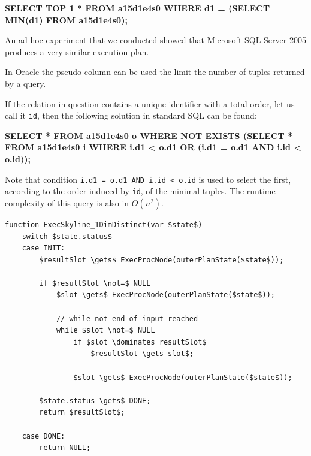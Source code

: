 \begin{interactive}
\textbf{SELECT TOP 1 * FROM a15d1e4s0 WHERE d1 = (SELECT MIN(d1) FROM a15d1e4s0);}
\end{interactive}

\noindent
An ad hoc experiment that we conducted showed that Microsoft SQL Server
2005 produces a very similar execution plan.

In Oracle the pseudo-column 
can be used the limit the number of tuples returned by a query.

If the relation in question contains a unique identifier with a total
order, let us call it \texttt{id}, then the following solution in
standard SQL can be found:

\begin{interactive}
\textbf{SELECT * FROM a15d1e4s0 o WHERE NOT EXISTS
    (SELECT * FROM a15d1e4s0 i WHERE i.d1 < o.d1 OR (i.d1 = o.d1 AND i.id < o.id));}
\end{interactive}

\noindent
Note that condition \texttt{i.d1 = o.d1 AND i.id < o.id} is used to
select the first, according to the order induced by \texttt{id}, of the
minimal tuples. The runtime complexity of this query is also in $O(n^2)$.

\begin{lstlisting}[language=pseudo,
caption={Pseudo-code for Special case: 1 dimensional distinct},
label={code:1dimdistinct}
]
function ExecSkyline_1DimDistinct(var $state$)
	switch $state.status$
	case INIT:
		$resultSlot \gets$ ExecProcNode(outerPlanState($state$));

		if $resultSlot \not=$ NULL
			$slot \gets$ ExecProcNode(outerPlanState($state$));

			// while not end of input reached
			while $slot \not=$ NULL
				if $slot \dominates resultSlot$
					$resultSlot \gets slot$;

				$slot \gets$ ExecProcNode(outerPlanState($state$));

		$state.status \gets$ DONE;
		return $resultSlot$;

	case DONE:
		return NULL;
\end{lstlisting}


